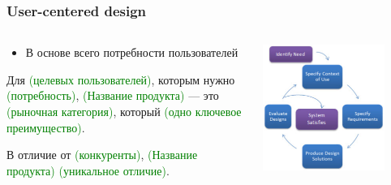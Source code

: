 \documentclass{../../slides-style}
\begin{document}
    \begin{frame}
        \frametitle{User-centered design}
        \begin{columns}
            \begin{column}{0.5\textwidth}
                \begin{itemize}
                    \item В основе всего потребности пользователей
                \end{itemize}
                Для \textcolor{green}{(целевых пользователей)}, которым нужно \textcolor{green}{(потребность)}, \textcolor{green}{(Название продукта)} --- это \textcolor{green}{(рыночная категория)}, который \textcolor{green}{(одно ключевое преимущество)}.

                \vspace{5mm}

                В отличие от \textcolor{green}{(конкуренты)}, \textcolor{green}{(Название продукта)} \textcolor{green}{(уникальное отличие)}.
            \end{column}
            \begin{column}{0.5\textwidth}
                \begin{center}
                    \includegraphics[width=0.8\textwidth]{userCenteredDesignLoop.png}
                \end{center}
            \end{column}
        \end{columns}
    \end{frame}
\end{document}
